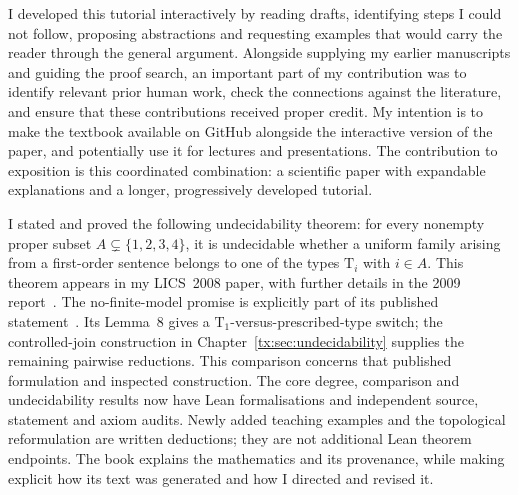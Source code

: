 I developed this tutorial interactively by reading drafts, identifying
steps I could not follow, proposing abstractions and requesting examples
that would carry the reader through the general argument. Alongside
supplying my earlier manuscripts and guiding the proof search, an
important part of my contribution was to identify relevant prior human
work, check the connections against the literature, and ensure that
these contributions received proper credit. My intention is to make
the textbook available on GitHub alongside the interactive
version of the paper, and potentially use it for lectures and
presentations. The contribution to exposition is this coordinated
combination: a scientific paper with expandable explanations and a
longer, progressively developed tutorial.

I stated and proved the following undecidability theorem: for every
nonempty proper subset $A\subsetneq\{1,2,3,4\}$, it is undecidable
whether a uniform family arising from a first-order sentence belongs
to one of the types $\mathrm T_i$ with $i\in A$.
This theorem appears in my LICS~2008 paper, with further details in
the 2009 report~\cite{Riis,RiisLong}.
The no-finite-model promise is explicitly part of its published
statement~\cite[Theorem~1]{Riis}. Its Lemma~8 gives a
$\mathrm T_1$-versus-prescribed-type switch; the controlled-join
construction in Chapter~\ref{tx:sec:undecidability} supplies the
remaining pairwise reductions. This comparison concerns that
published formulation and inspected construction.
The core degree, comparison and undecidability results now have Lean
formalisations and independent source, statement and axiom audits.
Newly added teaching examples and the topological reformulation are
written deductions; they are not additional Lean theorem endpoints. The book explains
the mathematics and its provenance, while making explicit how its text
was generated and how I directed and revised it.

\par\endgroup

